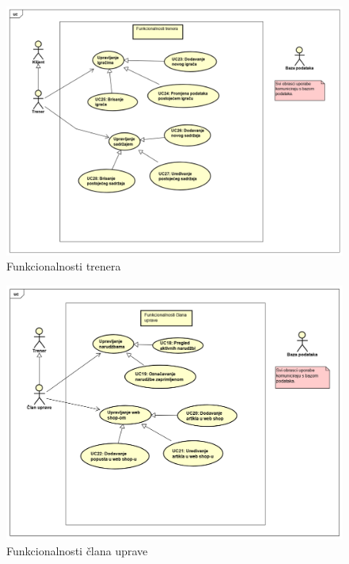 					\begin{figure}[H]
						\includegraphics[width=\linewidth]{dijagrami/Funkcionalnosti_trenera.png}
						\centering
						\caption{Funkcionalnosti trenera}
						\label{fig:UseCaseDiagram2}
					\end{figure}
				
					\begin{figure}[H]
						\includegraphics[width=\linewidth]{dijagrami/Funkcionalnosti_clana_uprave.png}
						\centering
						\caption{Funkcionalnosti člana uprave}
						\label{fig:UseCaseDiagram3}
					\end{figure}
				
